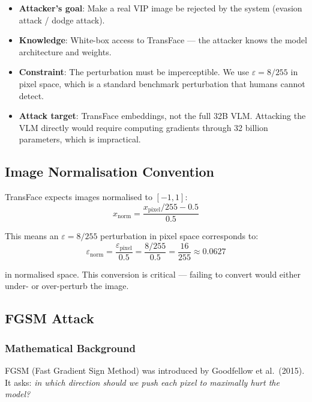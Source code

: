 \documentclass[12pt,a4paper]{article}
\begin{document}
\begin{itemize}
    \item \textbf{Attacker's goal}: Make a real VIP image be rejected by the system (evasion attack / dodge attack).
    \item \textbf{Knowledge}: White-box access to TransFace --- the attacker knows the model architecture and weights.
    \item \textbf{Constraint}: The perturbation must be imperceptible. We use $\varepsilon = 8/255$ in pixel space, which is a standard benchmark perturbation that humans cannot detect.
    \item \textbf{Attack target}: TransFace embeddings, not the full 32B VLM. Attacking the VLM directly would require computing gradients through 32 billion parameters, which is impractical.
\end{itemize}

\subsection{Image Normalisation Convention}

TransFace expects images normalised to $[-1, 1]$:
\begin{equation}
x_{\text{norm}} = \frac{x_{\text{pixel}} / 255 - 0.5}{0.5}
\end{equation}

This means an $\varepsilon = 8/255$ perturbation in pixel space corresponds to:
\begin{equation}
\varepsilon_{\text{norm}} = \frac{\varepsilon_{\text{pixel}}}{0.5} = \frac{8/255}{0.5} = \frac{16}{255} \approx 0.0627
\end{equation}

in normalised space. This conversion is critical --- failing to convert would either under- or over-perturb the image.

\subsection{FGSM Attack}

\subsubsection{Mathematical Background}

FGSM (Fast Gradient Sign Method) was introduced by Goodfellow et al.\ (2015). It asks: \textit{in which direction should we push each pixel to maximally hurt the model?}
\end{document}
